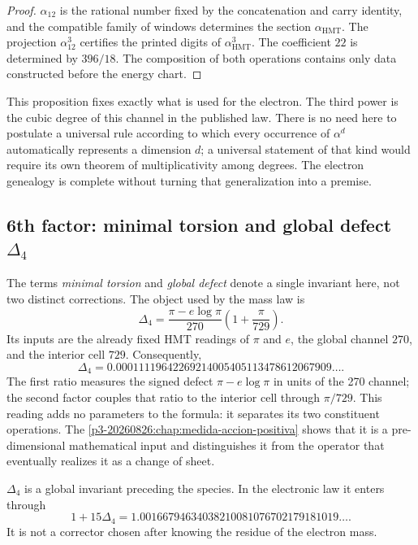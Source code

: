 \begin{proof}
\(\alpha_{12}\) is the rational number fixed by the concatenation and carry
identity, and the compatible family of windows determines the section
\(\alpha_{\mathrm{HMT}}\). The projection \(\alpha_{12}^3\) certifies the
printed digits of \(\alpha_{\mathrm{HMT}}^3\).
The coefficient \(22\) is determined by \(396/18\). The composition of
both operations contains only data constructed before the
energy chart.
\end{proof}

This proposition fixes exactly what is used for the electron. The third power is the cubic degree of this channel in the published law. There is no need here to postulate a universal rule according to which every occurrence of \(\alpha^d\) automatically represents a dimension \(d\); a universal statement of that kind would require its own theorem of multiplicativity among degrees. The electron genealogy is complete without turning that generalization into a premise.

\subsection{6th factor: minimal torsion and global defect \(\Delta_4\)}

The terms \emph{minimal torsion} and \emph{global defect}
denote a single invariant here, not two distinct corrections. The object
used by the mass law is
\begin{equation}
 \label{p12-83-c15-s2:eq:delta4-electron-rev6}
 \boxed{
 \Delta_4
 =
 \frac{\pi-e\log\pi}{270}
 \left(1+\frac{\pi}{729}\right).}
\end{equation}
Its inputs are the already fixed HMT readings of \(\pi\) and \(e\), the global
channel \(270\), and the interior cell \(729\). Consequently,
\[
 \Delta_4
 =
 0.00011119642269214005405113478612067909\ldots.
\]
The first ratio measures the signed defect \(\pi-e\log\pi\) in units of the 270 channel; the second factor couples that ratio to the interior cell through \(\pi/729\). This reading adds no parameters to the formula: it separates its two constituent operations. The \cref{p3-20260826:chap:medida-accion-positiva} shows that it is a pre-dimensional mathematical input and distinguishes it from the operator that eventually realizes it as a change of sheet.

\begin{proposition}
\label{p12-83-c15-s2:prop:delta4-global-electron-rev6}
\(\Delta_4\) is a global invariant preceding the species. In the electronic
law it enters through
\[
 1+15\Delta_4
 =
 1.00166794634038210081076702179181019\ldots.
\]
It is not a corrector chosen after knowing the residue of the electron mass.
\end{proposition}

